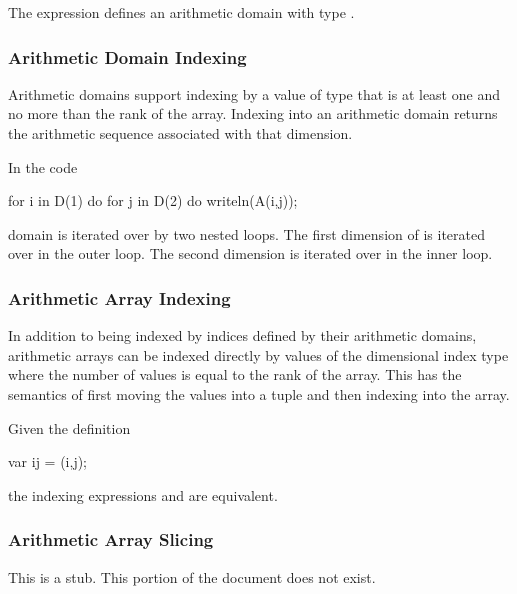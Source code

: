 \begin{example}
The expression \chpl{[1..5, 1..5]} defines an arithmetic domain with
type .
\end{example}

\subsubsection{Arithmetic Domain Indexing}
\label{Arithmetic_Domain_Indexing}

Arithmetic domains support indexing by a value of type  that
is at least one and no more than the rank of the array.  Indexing into
an arithmetic domain returns the arithmetic sequence associated with
that dimension.

\begin{example}
In the code
\begin{chapel}
for i in D(1) do
  for j in D(2) do
    writeln(A(i,j));
\end{chapel}
domain  is iterated over by two nested loops.  The first
dimension of  is iterated over in the outer loop.  The second
dimension is iterated over in the inner loop.
\end{example}

\subsubsection{Arithmetic Array Indexing}
\label{Arithmetic_Array_Indexing}

In addition to being indexed by indices defined by their arithmetic
domains, arithmetic arrays can be indexed directly by values of the
dimensional index type where the number of values is equal to the rank
of the array.  This has the semantics of first moving the values into
a tuple and then indexing into the array.

\begin{example}
Given the definition
\begin{chapel}
  var ij = (i,j);
\end{chapel}
the indexing expressions  and  are
equivalent.
\end{example}

\subsubsection{Arithmetic Array Slicing}
\label{Arithmetic_Array_Slicing}

This is a stub.  This portion of the document does not exist.

